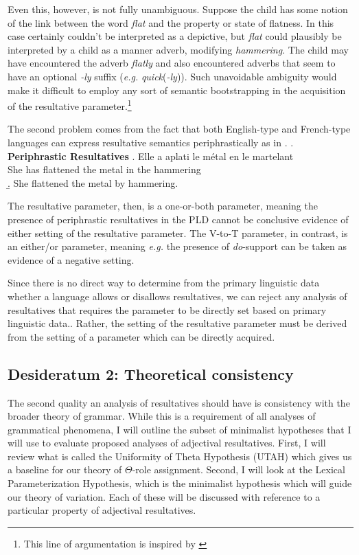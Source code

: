 \documentclass[MilwayThesis]{subfiles}
\begin{document}
Even this, however, is not fully unambiguous.
Suppose the child has some notion of the link between the word \textit{flat} and the property or state of flatness.
In this case \Last[b] certainly couldn't be interpreted as a depictive, but \textit{flat} could plausibly be interpreted by a child as a manner adverb, modifying \textit{hammering}.
The child may have encountered the adverb \textit{flatly} and also encountered adverbs that seem to have an optional \textit{-ly} suffix (\textit{e.g.} \textit{quick}(\textit{-ly})).
Such unavoidable ambiguity would make it difficult to employ any sort of semantic bootstrapping in the acquisition of the resultative parameter.\footnote{
	This line of argumentation is inspired by \textcite{gleitman1990structural,carey1985constraints,quine1960word} 
}

The second problem comes from the fact that both English-type and French-type languages can express resultative semantics periphrastically as in \Next.
\ex. \textbf{Periphrastic Resultatives}
\ag. Elle a aplati le m\'etal en le martelant\\
She has flattened the metal in the hammering\\
\b. She flattened the metal by hammering.

The resultative parameter, then, is a one-or-both parameter, meaning the presence of periphrastic resultatives in the PLD cannot be conclusive evidence of either setting of the resultative parameter.
The V-to-T parameter, in contrast, is an either/or parameter, meaning \textit{e.g.} the presence of \textit{do}-support can be taken as evidence of a negative setting.

Since there is no direct way to determine from the primary linguistic data whether a language allows or disallows resultatives, we can reject any analysis of resultatives that requires the parameter to be directly set based on primary linguistic data..
Rather, the setting of the resultative parameter must be derived from the setting of a parameter which can be directly acquired.

\subsection{Desideratum 2: Theoretical consistency}
The second quality an analysis of resultatives should have is consistency with the broader theory of grammar.
While this is a requirement of all analyses of grammatical phenomena, I will outline the subset of minimalist hypotheses that I will use to evaluate proposed analyses of adjectival resultatives.
First, I will review what is called the Uniformity of Theta Hypothesis (UTAH) which gives us a baseline for our theory of $\Theta$-role assignment.
Second, I will look at the Lexical Parameterization Hypothesis, which is the minimalist hypothesis which will guide our theory of variation.
Each of these will be discussed with reference to a particular property of adjectival resultatives.
\end{document}
